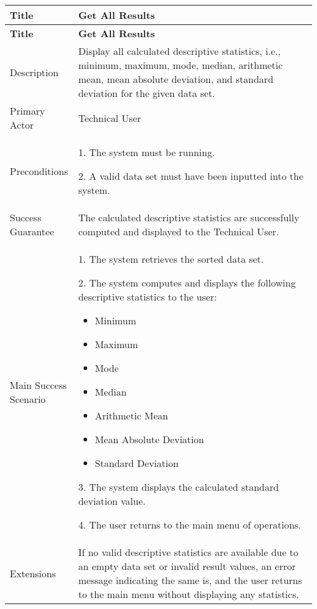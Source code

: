     \begin{longtable}{|p{0.227\linewidth}|p{0.773\linewidth}|}
    \hline
    \textbf{Title} & \textbf{Get All Results} \\
    \hline
    \endfirsthead
    \hline
    \textbf{Title} & \textbf{Get All Results} \\
    \hline
    \endhead
    \hline
    \endfoot
    \hline
    \endlastfoot
    Description & Display all calculated descriptive statistics, i.e.,
    minimum, maximum, mode, median, arithmetic mean, mean absolute
    deviation, and standard deviation for the given data set. \\ \hline
    Primary Actor & Technical User \\ \hline
    Preconditions & 1. The system must be running.
    
    2. A valid data set must have been inputted into the system. \\ \hline
    Success Guarantee & The calculated descriptive statistics are
    successfully computed and displayed to the Technical User. \\ \hline
    Main Success Scenario & \begin{minipage}[t]{\linewidth}\raggedright
    1. The system retrieves the sorted data set.
    
    2. The system computes and displays the following descriptive statistics
    to the user:
    
    \begin{itemize}
    \item
      Minimum
    \item
      Maximum
    \item
      Mode
    \item
      Median
    \item
      Arithmetic Mean
    \item
      Mean Absolute Deviation
    \item
      Standard Deviation
    \end{itemize}
    
    3. The system displays the calculated standard deviation value.
    
    4. The user returns to the main menu of operations.
    \end{minipage} \\ \hline
    Extensions & If no valid descriptive statistics are available due to an
    empty data set or invalid result values, an error message indicating the
    same is, and the user returns to the main menu without displaying any
    statistics.
    \end{longtable}
    
